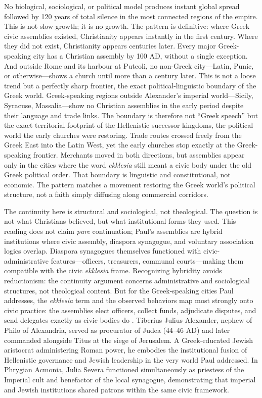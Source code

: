 No biological, sociological, or political model produces instant global spread followed by 120 years of total silence in the most connected regions of the empire.
This is not slow growth; it is no growth.
The pattern is definitive: where Greek civic assemblies existed, Christianity appears instantly in the first century.
Where they did not exist, Christianity appears centuries later.
Every major Greek-speaking city has a Christian assembly by 100 AD, without a single exception.
And outside Rome and its harbour at Puteoli, no non-Greek city---Latin, Punic, or otherwise---shows a church until more than a century later.
This is not a loose trend but a perfectly sharp frontier, the exact political-linguistic boundary of the Greek world.
Greek-speaking regions outside Alexander's imperial world---Sicily, Syracuse, Massalia---show no Christian assemblies in the early period despite their language and trade links.
The boundary is therefore not ``Greek speech'' but the exact territorial footprint of the Hellenistic successor kingdoms, the political world the early churches were restoring.
Trade routes crossed freely from the Greek East into the Latin West, yet the early churches stop exactly at the Greek-speaking frontier.
Merchants moved in both directions, but assemblies appear only in the cities where the word \textit{ekklesia} still meant a civic body under the old Greek political order.
That boundary is linguistic and constitutional, not economic.
The pattern matches a movement restoring the Greek world's political structure, not a faith simply diffusing along commercial corridors.

The continuity here is structural and sociological, not theological.
The question is not what Christians believed, but what institutional forms they used.
This reading does not claim \emph{pure} continuation; Paul's assemblies are hybrid institutions where civic assembly, diaspora synagogue, and voluntary association logics overlap.
Diaspora synagogues themselves functioned with civic-administrative features---officers, treasurers, communal courts---making them compatible with the civic \emph{ekklesia} frame.
Recognizing hybridity avoids reductionism: the continuity argument concerns administrative and sociological structures, not theological content.
But for the Greek-speaking cities Paul addresses, the \emph{ekklesia} term and the observed behaviors map most strongly onto civic practice: the assemblies elect officers, collect funds, adjudicate disputes, and send delegates exactly as civic bodies do \cite{park:ekklesia,esler:galatians,vankooten:ekklesia}.
Tiberius Julius Alexander, nephew of Philo of Alexandria, served as procurator of Judea (44--46 AD) and later commanded alongside Titus at the siege of Jerusalem.
A Greek-educated Jewish aristocrat administering Roman power, he embodies the institutional fusion of Hellenistic governance and Jewish leadership in the very world Paul addressed.
In Phrygian Acmonia, Julia Severa functioned simultaneously as priestess of the Imperial cult and benefactor of the local synagogue, demonstrating that imperial and Jewish institutions shared patrons within the same civic framework.

